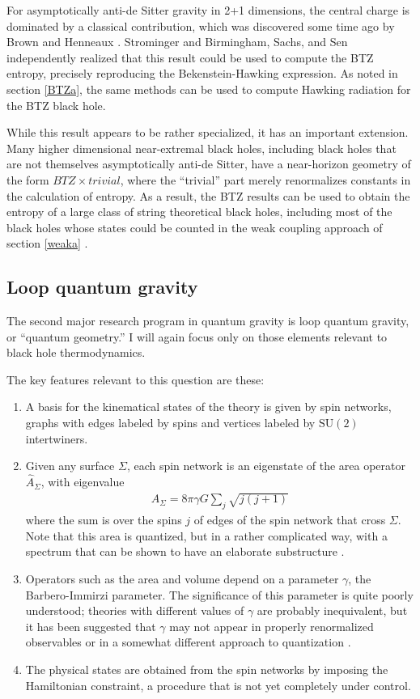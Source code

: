 \documentclass[12pt]{article}
\begin{document}
For asymptotically anti-de Sitter gravity in 2+1 dimensions, the 
central charge is dominated by a classical contribution, which was 
discovered some time ago by Brown and Henneaux \cite{BrownHen}.  
Strominger \cite{Strominger} and Birmingham, Sachs, and Sen 
\cite{BSS} independently realized that this result could be used to 
compute the BTZ  entropy, precisely reproducing the 
Bekenstein-Hawking expression.  As noted in section \ref{BTZa},
the same methods can be used to compute Hawking radiation for
the BTZ black hole.

While this result appears to be rather specialized, it has an important
extension.  Many higher dimensional near-extremal black holes,
including black holes that are not themselves asymptotically anti-de 
Sitter, have a near-horizon geometry of the form 
$\mathit{BTZ}\times\mathit{trivial}$, where the ``trivial'' part merely 
renormalizes constants in the calculation of entropy.  As a result, the 
BTZ results can be used to obtain the entropy of a large class of string
theoretical black holes, including most of the black holes whose states 
could be counted in the weak coupling approach of section \ref{weaka} 
\cite{Skenderisb}.

\subsection{Loop quantum gravity \label{loopa}}

The second major research program in quantum gravity is loop 
quantum gravity, or ``quantum geometry.''  I will again focus 
only on those elements relevant to black hole thermodynamics.

The key features  relevant to this question are these:
\begin{enumerate} 
\item A basis for the kinematical states of the theory is given by
spin networks, graphs with edges labeled by 
spins and vertices labeled by $\mathrm{SU}(2)$ intertwiners.
\item Given any surface $\Sigma$, each spin network is an eigenstate 
of the area operator ${\hat A}_\Sigma$, with eigenvalue
\begin{align}
A_\Sigma = 8\pi\gamma G \sum_j \sqrt{j(j+1)} 
\label{Carlipg5}
\end{align}
where the sum is over the spins $j$ of edges of the spin network 
that cross $\Sigma$.  Note that this area is quantized, but in a
rather complicated way, with a spectrum that can be shown to have
an elaborate substructure \cite{Corichi,Agullo}.
\item Operators such as the area and volume  depend on a
parameter $\gamma$, the Barbero-Immirzi parameter.
The significance of this 
parameter is quite poorly understood; theories with different values of 
$\gamma$ are probably inequivalent, but it has been suggested that 
$\gamma$ may not appear in properly renormalized observables 
\cite{Jacobsone} or in a somewhat different approach to quantization 
\cite{Alexandrov}.
\item The physical states are obtained from the spin networks by
imposing the Hamiltonian constraint, a procedure that is not yet
completely under control.
\end{enumerate}
\end{document}
